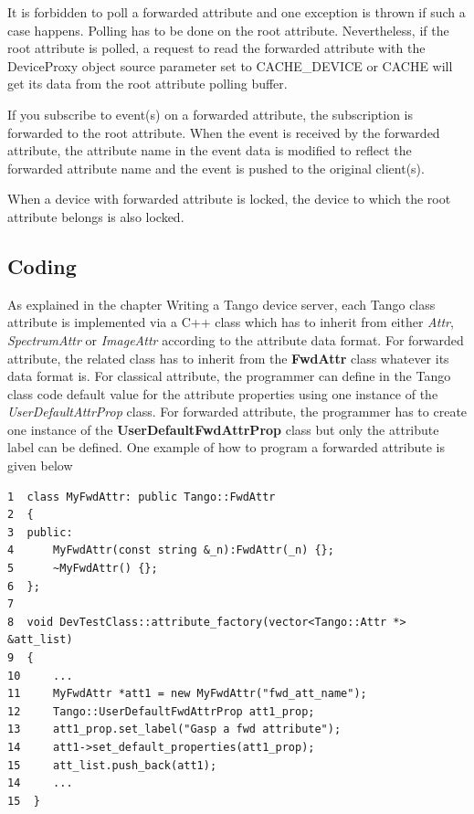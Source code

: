 It is forbidden to poll a forwarded attribute and one exception is
thrown if such a case happens. Polling has to be done on the root
attribute. Nevertheless, if the root attribute is polled, a request
to read the forwarded attribute with the DeviceProxy object source
parameter set to CACHE\_DEVICE or CACHE will get its data from the
root attribute polling buffer.

If you subscribe to event(s) on a forwarded attribute, the subscription
is forwarded to the root attribute. When the event is received by
the forwarded attribute, the attribute name in the event data is modified
to reflect the forwarded attribute name and the event is pushed to
the original client(s).

When a device with forwarded attribute is locked, the device to which
the root attribute belongs is also locked.


\subsection{Coding}

As explained in the chapter \textquotedbl{}Writing a Tango device
server\textquotedbl{}, each Tango class attribute is implemented via
a C++ class which has to inherit from either \emph{Attr}, \emph{SpectrumAttr}
or \emph{ImageAttr} according to the attribute data format. For forwarded
attribute, the related class has to inherit from the \textbf{FwdAttr}
class whatever its data format is. For classical attribute, the programmer
can define in the Tango class code default value for the attribute
properties using one instance of the \emph{UserDefaultAttrProp} class.
For forwarded attribute, the programmer has to create one instance
of the \textbf{UserDefaultFwdAttrProp}
class but only the attribute label can be defined. One example of
how to program a forwarded attribute is given below


\begin{verbatim}
1  class MyFwdAttr: public Tango::FwdAttr
2  { 
3  public:     
4      MyFwdAttr(const string &_n):FwdAttr(_n) {}; 	
5      ~MyFwdAttr() {}; 
6  };
7
8  void DevTestClass::attribute_factory(vector<Tango::Attr *> &att_list)
9  {
10     ...
11     MyFwdAttr *att1 = new MyFwdAttr("fwd_att_name");
12     Tango::UserDefaultFwdAttrProp att1_prop; 	
13     att1_prop.set_label("Gasp a fwd attribute");
14     att1->set_default_properties(att1_prop); 	
15     att_list.push_back(att1);
14     ...
15  }
\end{verbatim}


